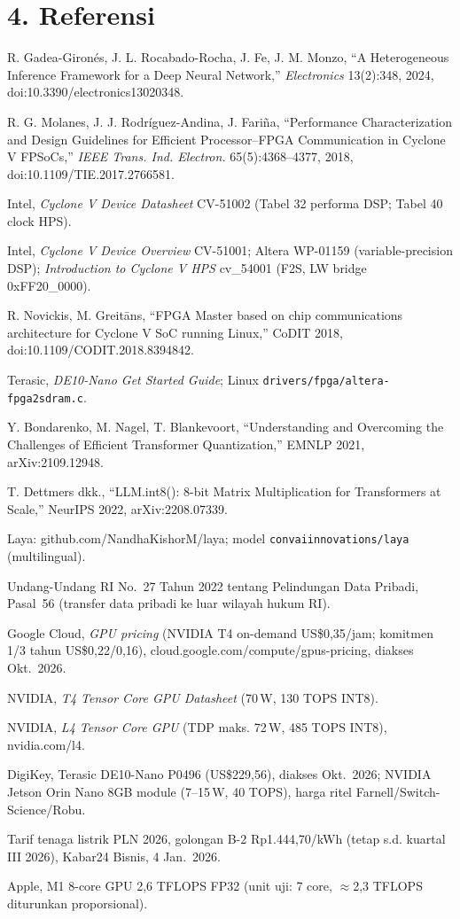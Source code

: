 \documentclass[10pt]{article}
\newcommand{\code}[1]{\texttt{\small #1}}
\begin{document}
\section{4. Referensi}
{\small
\begin{enumerate}[leftmargin=6mm, label={[\arabic*]}]
\item R. Gadea-Giron\'es, J. L. Rocabado-Rocha, J. Fe, J. M. Monzo, ``A Heterogeneous Inference Framework for a Deep Neural Network,'' \emph{Electronics} 13(2):348, 2024, doi:10.3390/electronics13020348.
\item R. G. Molanes, J. J. Rodr\'iguez-Andina, J. Fari\~na, ``Performance Characterization and Design Guidelines for Efficient Processor--FPGA Communication in Cyclone V FPSoCs,'' \emph{IEEE Trans. Ind. Electron.} 65(5):4368--4377, 2018, doi:10.1109/TIE.2017.2766581.
\item Intel, \emph{Cyclone V Device Datasheet} CV-51002 (Tabel 32 performa DSP; Tabel 40 clock HPS).
\item Intel, \emph{Cyclone V Device Overview} CV-51001; Altera WP-01159 (variable-precision DSP); \emph{Introduction to Cyclone V HPS} cv\_54001 (F2S, LW bridge 0xFF20\_0000).
\item R. Novickis, M. Greit\=ans, ``FPGA Master based on chip communications architecture for Cyclone V SoC running Linux,'' CoDIT 2018, doi:10.1109/CODIT.2018.8394842.
\item Terasic, \emph{DE10-Nano Get Started Guide}; Linux \code{drivers/fpga/altera-fpga2sdram.c}.
\item Y. Bondarenko, M. Nagel, T. Blankevoort, ``Understanding and Overcoming the Challenges of Efficient Transformer Quantization,'' EMNLP 2021, arXiv:2109.12948.
\item T. Dettmers dkk., ``LLM.int8(): 8-bit Matrix Multiplication for Transformers at Scale,'' NeurIPS 2022, arXiv:2208.07339.
\item Laya: github.com/NandhaKishorM/laya; model \code{convaiinnovations/laya} (multilingual).
\item Undang-Undang RI No.~27 Tahun 2022 tentang Pelindungan Data Pribadi, Pasal~56 (transfer data pribadi ke luar wilayah hukum RI).
\item Google Cloud, \emph{GPU pricing} (NVIDIA T4 on-demand US\$0,35/jam; komitmen 1/3 tahun US\$0,22/0,16), cloud.google.com/compute/gpus-pricing, diakses Okt.~2026.
\item NVIDIA, \emph{T4 Tensor Core GPU Datasheet} (70\,W, 130 TOPS INT8).
\item NVIDIA, \emph{L4 Tensor Core GPU} (TDP maks. 72\,W, 485 TOPS INT8), nvidia.com/l4.
\item DigiKey, Terasic DE10-Nano P0496 (US\$229,56), diakses Okt.~2026; NVIDIA Jetson Orin Nano 8GB module (7--15\,W, 40 TOPS), harga ritel Farnell/Switch-Science/Robu.
\item Tarif tenaga listrik PLN 2026, golongan B-2 Rp1.444,70/kWh (tetap s.d. kuartal III 2026), Kabar24 Bisnis, 4 Jan.~2026.
\item Apple, M1 8-core GPU 2,6 TFLOPS FP32 (unit uji: 7 core, $\approx$2,3 TFLOPS diturunkan proporsional).
\end{enumerate}}
\end{document}
